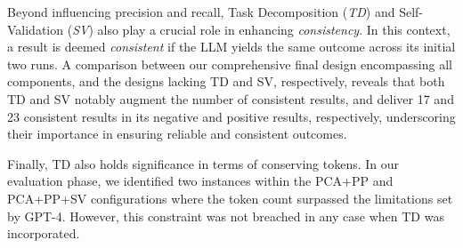 Beyond influencing precision and recall, Task Decomposition (\textit{TD}) and Self-Validation (\textit{SV}) also play a crucial role in enhancing \textit{consistency}. In this context, a result is deemed \textit{consistent} if the LLM yields the same outcome across its initial two runs. A comparison between our comprehensive final design encompassing all components, and the designs lacking TD and SV, respectively, reveals that both TD and SV notably augment the number of consistent results, and deliver 17 and 23 consistent results in its negative and positive results, respectively, underscoring their importance in ensuring reliable and consistent outcomes.


Finally, TD also holds significance in terms of conserving tokens. 
In our evaluation phase, we identified two instances within the PCA+PP and PCA+PP+SV configurations where the token count surpassed the limitations set by GPT-4. However, this constraint was not breached in any case when TD was incorporated. 





